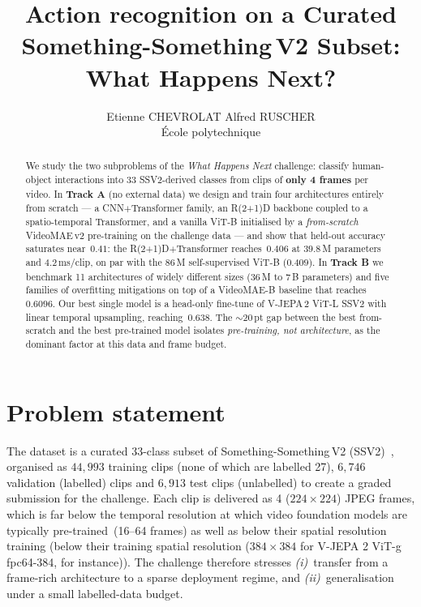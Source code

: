 \documentclass[10pt,twocolumn,letterpaper]{article}
\begin{document}
\title{Action recognition on a Curated Something-Something\,V2 Subset:\\ What Happens Next?}

\author{Etienne CHEVROLAT \quad Alfred RUSCHER\\
\'Ecole polytechnique}

\maketitle

\begin{abstract}
We study the two subproblems of the \emph{What Happens Next} challenge:
classify human-object interactions into 33 SSV2-derived classes from
clips of \textbf{only 4 frames} per video. In \textbf{Track A} (no external
data) we design and train four architectures entirely from scratch --- a
CNN$+$Transformer family, an R(2+1)D backbone coupled to a spatio-temporal
Transformer, and a vanilla ViT-B initialised by a \emph{from-scratch}
VideoMAE\,v2 pre-training on the challenge data --- and show that held-out
accuracy saturates near~$0.41$: the R(2+1)D$+$Transformer reaches~$0.406$
at $39.8$\,M parameters and $4.2$\,ms/clip, on par with the $86$\,M
self-supervised ViT-B ($0.409$). In \textbf{Track B} we benchmark 11
architectures of widely different sizes ($36$\,M to $7$\,B parameters) and
five families of overfitting mitigations on top of a VideoMAE-B baseline
that reaches~$0.6096$. Our best single model is a head-only fine-tune of
V-JEPA\,2 ViT-L SSV2 with linear temporal upsampling, reaching~$0.638$. The
$\sim$20\,pt gap between the best from-scratch and the best pre-trained
model isolates \emph{pre-training, not architecture}, as the dominant factor
at this data and frame budget.
\end{abstract}

\section{Problem statement}
\label{sec:intro}

The dataset is a curated 33-class subset of Something-Something\,V2
(SSV2)~\cite{goyal2017something}, organised as $44{,}993$ training
clips (none of which are labelled 27), $6{,}746$ validation (labelled) clips and $6{,}913$ test clips (unlabelled) to create a graded submission for the challenge. Each clip is delivered as
4 ($224\times 224$) JPEG frames, which is far below the temporal
resolution at which video foundation models are typically
pre-trained~(16--64 frames) as well as below their spatial resolution training (below their training spatial resolution ($384\times 384$ for V-JEPA 2 ViT-g fpc64-384, for instance)). The challenge therefore stresses
\emph{(i)}~transfer from a frame-rich architecture to a sparse
deployment regime, and \emph{(ii)}~generalisation under a small
labelled-data budget.
\end{document}
